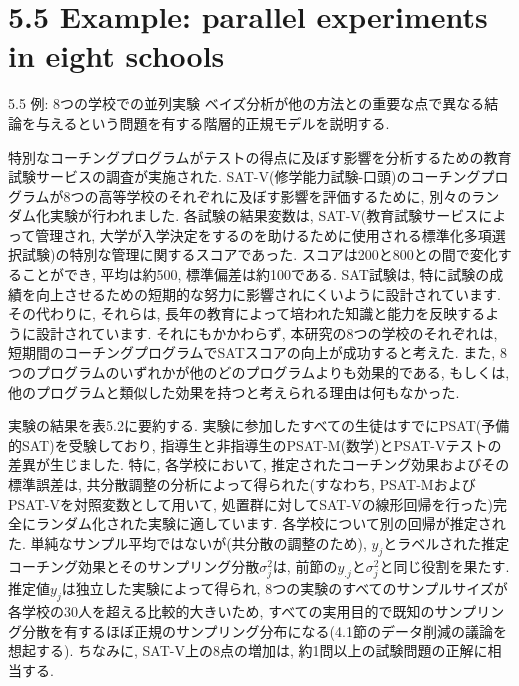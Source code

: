 \documentclass[10pt,dvipdfmx,a4]{beamer}
\begin{document}

\section{5.5 Example: parallel experiments in eight schools}
\begin{frame}{5.5 例: 8つの学校での並列実験}
ベイズ分析が他の方法との重要な点で異なる結論を与えるという問題を有する階層的正規モデルを説明する.

特別なコーチングプログラムがテストの得点に及ぼす影響を分析するための教育試験サービスの調査が実施された.
SAT-V(修学能力試験-口頭)のコーチングプログラムが8つの高等学校のそれぞれに及ぼす影響を評価するために, 別々のランダム化実験が行われました.
各試験の結果変数は, SAT-V(教育試験サービスによって管理され, 大学が入学決定をするのを助けるために使用される標準化多項選択試験)の特別な管理に関するスコアであった.
スコアは200と800との間で変化することができ, 平均は約500, 標準偏差は約100である.
SAT試験は, 特に試験の成績を向上させるための短期的な努力に影響されにくいように設計されています.
その代わりに, それらは, 長年の教育によって培われた知識と能力を反映するように設計されています.
それにもかかわらず, 本研究の8つの学校のそれぞれは, 短期間のコーチングプログラムでSATスコアの向上が成功すると考えた.
また, 8つのプログラムのいずれかが他のどのプログラムよりも効果的である, もしくは, 他のプログラムと類似した効果を持つと考えられる理由は何もなかった.
\end{frame}


\begin{frame}
実験の結果を表5.2に要約する.
実験に参加したすべての生徒はすでにPSAT(予備的SAT)を受験しており, 指導生と非指導生のPSAT-M(数学)とPSAT-Vテストの差異が生じました.
特に, 各学校において, 推定されたコーチング効果およびその標準誤差は, 共分散調整の分析によって得られた(すなわち, PSAT-MおよびPSAT-Vを対照変数として用いて, 処置群に対してSAT-Vの線形回帰を行った)完全にランダム化された実験に適しています.
各学校について別の回帰が推定された.
単純なサンプル平均ではないが(共分散の調整のため), $y_j$とラベルされた推定コーチング効果とそのサンプリング分散$\sigma^2_j$は, 前節の$y_{.j}$と$\sigma^2_j$と同じ役割を果たす.
推定値$y_j$は独立した実験によって得られ, 8つの実験のすべてのサンプルサイズが各学校の30人を超える比較的大きいため, すべての実用目的で既知のサンプリング分散を有するほぼ正規のサンプリング分布になる(4.1節のデータ削減の議論を想起する).
ちなみに, SAT-V上の8点の増加は, 約1問以上の試験問題の正解に相当する.
\end{frame}
\end{document}

